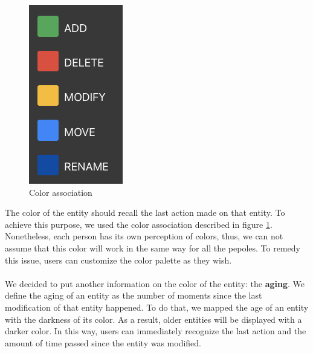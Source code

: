 \begin{figure}
    \begin{center}
        \includegraphics[width=0.7\linewidth]{ColorAssociation.png} 
        \caption{Color association}
        \label{fig:ColorAssociation}
    \end{center}
\end{figure}

The color of the entity should recall the last action made on that entity. To achieve this purpose, we used the color association described in figure \ref{fig:ColorAssociation}.
Nonetheless, each person has its own perception of colors, thus, we can not assume that this color will work in the same way for all the pepoles.
To remedy this issue, users can customize the color palette as they wish. \\
\\
We decided to put another information on the color of the entity: the \textbf{aging}. 
We define the aging of an entity as the number of moments since the last modification of that entity happened.
To do that, we mapped the age of an entity with the darkness of its color. 
As a result, older entities will be displayed with a darker color. 
In this way, users can immediately recognize the last action and the amount of time passed since the entity was modified.


